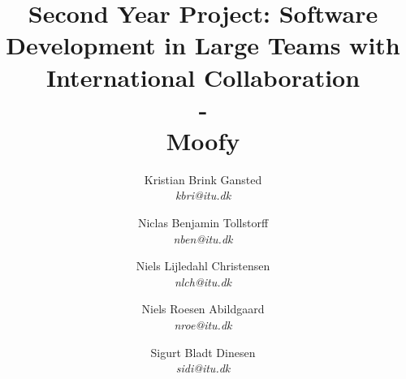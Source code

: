 \title{Second Year Project: Software Development in Large Teams with International Collaboration\\-\\Moofy}
\author{Kristian Brink Gansted\\ \emph{kbri@itu.dk}
    \and Niclas Benjamin Tollstorff\\ \emph{nben@itu.dk}
    \and Niels Lijledahl Christensen\\ \emph{nlch@itu.dk}
    \and Niels Roesen Abildgaard\\ \emph{nroe@itu.dk}
    \and Sigurt Bladt Dinesen\\ \emph{sidi@itu.dk}}

\maketitle
